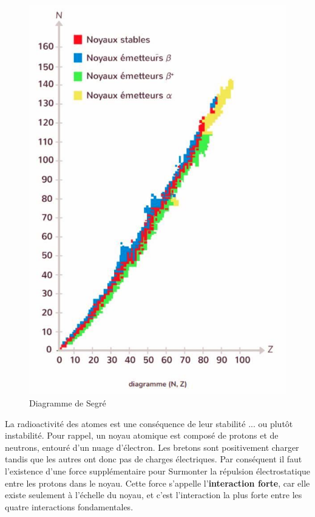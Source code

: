 \documentclass[11pt,a4paper]{article}
\begin{document}
\begin{figure}
\centering
\includegraphics[width=0.95\linewidth]{imgs/p8/radioactivitynoyau.jpg}
\caption{Diagramme de Segré}
\label{fig:segré}
\end{figure}

La radioactivité des atomes est une conséquence de leur stabilité ... ou plutôt instabilité. Pour rappel, un noyau atomique est composé de protons et de neutrons, entouré d'un nuage d'électron. Les bretons sont positivement charger tandis que les autres ont donc pas de charges électriques. Par conséquent il faut l'existence d'une force supplémentaire pour Surmonter la répulsion électrostatique entre les protons dans le noyau. Cette force s'appelle l'\textbf{interaction forte}, car elle existe seulement à l'échelle du noyau, et c'est l'interaction la plus forte entre les quatre interactions fondamentales.
\end{document}
